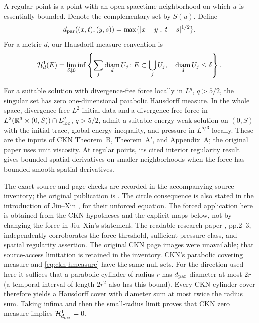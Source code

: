 A regular point is a point with an open spacetime neighborhood on which
$u$ is essentially bounded. Denote the complementary set by $S(u)$.
Define
\begin{equation}\label{eq:ckn-parabolic-metric}
 d_{\rm par}((x,t),(y,s))=\max\{|x-y|,|t-s|^{1/2}\}.
\end{equation}
For a metric $d$, our Hausdorff measure convention is
\begin{equation}\label{eq:ckn-hmeasure}
 \mathcal H^1_d(E)=\lim_{\delta\downarrow0}
 \inf\left\{\sum_j\mathop{\rm diam}_d U_j:
 E\subset\bigcup_jU_j,\quad \mathop{\rm diam}_d U_j\leq\delta\right\}.
\end{equation}

\begin{theorem}\label{thm:ckn-external}
For a suitable solution with divergence-free force locally in $L^q$,
$q>5/2$, the singular set has zero one-dimensional parabolic Hausdorff
measure. In the whole space, divergence-free $L^2$ initial data and a
divergence-free force in $L^2(\mathbb R^3\times(0,S))\cap L^q_{\rm loc}$,
$q>5/2$, admit a suitable energy weak solution on $(0,S)$ with the initial
trace, global energy inequality, and pressure in $L^{5/3}$ locally.
These are the inputs of CKN Theorem~B, Theorem~A', and Appendix~A;
the original paper uses unit viscosity. At regular points, its cited
interior regularity result gives bounded spatial derivatives on smaller
neighborhoods when the force has bounded smooth spatial derivatives.
\end{theorem}

The exact source and page checks are recorded in the accompanying source
inventory; the original publication is \cite{CKN82Verified}.
The circle consequence is also stated in the introduction of
Jiu--Xin \cite{JiuXin15Verified}, for their unforced equation. The forced
application here is obtained from the CKN hypotheses and the explicit
maps below, not by changing the force in Jiu--Xin's statement.
The readable research paper \cite{CLM2016Verified}, pp.2--3, independently
corroborates the force threshold, sufficient pressure class, and spatial
regularity assertion. The original CKN page images were unavailable;
that source-access limitation is retained in the inventory.
CKN's parabolic covering measure and \eqref{eq:ckn-hmeasure} have the same
null sets. For the direction used here it suffices that a parabolic
cylinder of radius $r$ has $d_{\rm par}$-diameter at most $2r$ (a temporal
interval of length $2r^2$ also has this bound). Every CKN cylinder cover
therefore yields a Hausdorff cover with diameter sum at most twice the
radius sum. Taking infima and then the small-radius limit proves that
CKN zero measure implies $\mathcal H^1_{d_{\rm par}}=0$.

